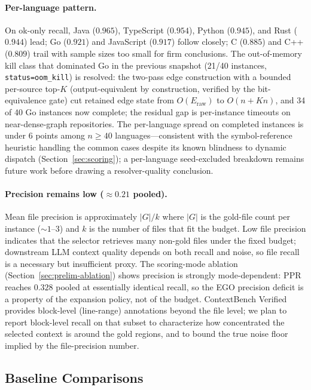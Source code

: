 \documentclass[11pt, a4paper]{article}
\begin{document}
\paragraph{Per-language pattern.} On ok-only recall, Java ($0.965$), TypeScript ($0.954$), Python ($0.945$), and Rust ($0.944$) lead; Go ($0.921$) and JavaScript ($0.917$) follow closely; C ($0.885$) and C++ ($0.809$) trail with sample sizes too small for firm conclusions. The out-of-memory kill class that dominated Go in the previous snapshot (21/40 instances, \texttt{status=oom\_kill}) is resolved: the two-pass edge construction with a bounded per-source top-$K$ (output-equivalent by construction, verified by the bit-equivalence gate) cut retained edge state from $O(E_{\mathrm{raw}})$ to $O(n + Kn)$, and 34 of 40 Go instances now complete; the residual gap is per-instance timeouts on near-dense-graph repositories. The per-language spread on completed instances is under 6 points among $n \geq 40$ languages---consistent with the symbol-reference heuristic handling the common cases despite its known blindness to dynamic dispatch (Section~\ref{sec:scoring}); a per-language seed-excluded breakdown remains future work before drawing a resolver-quality conclusion.

\paragraph{Precision remains low ($\approx 0.21$ pooled).} Mean file precision is approximately $|G|/k$ where $|G|$ is the gold-file count per instance ($\sim 1$--$3$) and $k$ is the number of files that fit the budget. Low file precision indicates that the selector retrieves many non-gold files under the fixed budget; downstream LLM context quality depends on both recall and noise, so file recall is a necessary but insufficient proxy. The scoring-mode ablation (Section~\ref{sec:prelim-ablation}) shows precision is strongly mode-dependent: PPR reaches $0.328$ pooled at essentially identical recall, so the EGO precision deficit is a property of the expansion policy, not of the budget. ContextBench Verified provides block-level (line-range) annotations beyond the file level; we plan to report block-level recall on that subset to characterize how concentrated the selected context is around the gold regions, and to bound the true noise floor implied by the file-precision number.

\subsection{Baseline Comparisons}
\label{sec:prelim-baselines}
\end{document}
